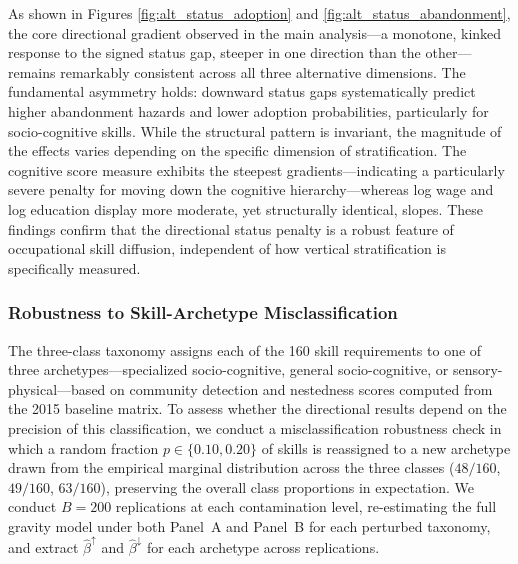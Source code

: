 \documentclass[11pt, letterpaper]{article} %
\begin{document}
As shown in Figures \ref{fig:alt_status_adoption} and \ref{fig:alt_status_abandonment}, the core directional gradient observed in the main analysis---a monotone, kinked response to the signed status gap, steeper in one direction than the other---remains remarkably consistent across all three alternative dimensions. The fundamental asymmetry holds: downward status gaps systematically predict higher abandonment hazards and lower adoption probabilities, particularly for socio-cognitive skills. While the structural pattern is invariant, the magnitude of the effects varies depending on the specific dimension of stratification. The cognitive score measure exhibits the steepest gradients---indicating a particularly severe penalty for moving down the cognitive hierarchy---whereas log wage and log education display more moderate, yet structurally identical, slopes. These findings confirm that the directional status penalty is a robust feature of occupational skill diffusion, independent of how vertical stratification is specifically measured.







\subsubsection{Robustness to Skill-Archetype Misclassification}
\label{sec:SI_missclass}

The three-class taxonomy assigns each of the 160 skill requirements to one of three archetypes---specialized socio-cognitive, general socio-cognitive, or sensory-physical---based on community detection and nestedness scores computed from the 2015 baseline matrix. To assess whether the directional results depend on the precision of this classification, we conduct a misclassification robustness check in which a random fraction $p \in \{0.10, 0.20\}$ of skills is reassigned to a new archetype drawn from the empirical marginal distribution across the three classes ($48/160$, $49/160$, $63/160$), preserving the overall class proportions in expectation. We conduct $B = 200$ replications at each contamination level, re-estimating the full gravity model under both Panel~A and Panel~B for each perturbed taxonomy, and extract $\hat{\beta}^{\uparrow}$ and $\hat{\beta}^{\downarrow}$ for each archetype across replications.
\end{document}
